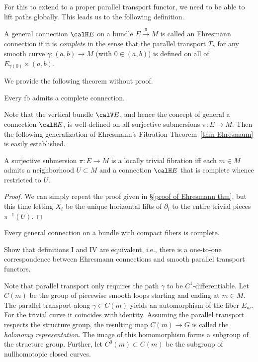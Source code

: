 For this to extend to a proper parallel transport functor, we need to be able to lift paths globally. This leads us to the following definition.

\begin{defn}
    A general connection $\calH E$ on a bundle $E\overset{\pi}{\to}M$ is called an Ehresmann connection if it is \emph{complete} in the sense that the parallel transport $T_\gamma$ for any smooth curve $\gamma:(a,b)\to M$ (with $0\in (a,b)$) is defined on all of $E_{\gamma(0)}\times (a,b)$. 
\end{defn}
We provide the following theorem without proof.
\begin{thm}
    Every \gls{fb} admits a complete connection.
\end{thm}

Note that the vertical bundle $\calV E$, and hence the concept of general a connection $\calH E$, is well-defined on all surjective submersions $\pi:E\to M$. Then the following generalization of Ehresmann's Fibration Theorem~\ref{thm Ehresmann} is easily established.
\begin{thm}[Ehresmann]
    A surjective submersion $\pi:E\to M$ is a locally trivial fibration iff  each $m\in M$ admits a neighborhood $U\subset M$ and a connection $\calH E$ that is complete whence restricted to $U$.
\end{thm}
\begin{proof}
    We can simply repeat the proof given in \S\ref{proof of Ehresmann thm}, but this time letting $X_i$ be the unique horizontal lifts of $\partial_i$ to the entire trivial pieces $\pi^{-1}(U)$.
\end{proof}

\begin{example}
    Every general connection on a bundle with compact fibers is complete. 
\end{example}


\begin{xca}
    Show that definitions I and IV are equivalent, i.e., there is a one-to-one correspondence between Ehresmann connections and smooth parallel transport functors.
\end{xca}


Note that parallel transport only requires the path $\gamma$ to be $C^1$-differentiable. Let $C(m)$ be the group of piecewise smooth loops starting and ending at $m\in M$. The parallel transport along $\gamma\in C(m)$ yields an automorphism of the fiber $E_m$. For the trivial curve it coincides with identity. Assuming the parallel transport respects the structure group, the resulting map $C(m)\to G$ is called the \emph{holonomy representation}. The image of this homomorphism forms a subgroup of the structure group. Further, let $C^0(m)\subset C(m)$ be the subgroup of nullhomotopic closed curves.

